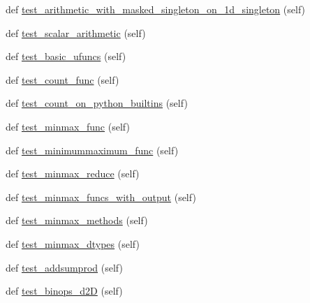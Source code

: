 \begin{DoxyCompactItemize}
\item 
def \hyperlink{classnumpy_1_1ma_1_1tests_1_1test__core_1_1TestMaskedArrayArithmetic_a35cb9471e5ad18795c32c9a44035321c}{test\+\_\+arithmetic\+\_\+with\+\_\+masked\+\_\+singleton\+\_\+on\+\_\+1d\+\_\+singleton} (self)
\item 
def \hyperlink{classnumpy_1_1ma_1_1tests_1_1test__core_1_1TestMaskedArrayArithmetic_a9ee91ba07bc291ebd9e2cf14cf554380}{test\+\_\+scalar\+\_\+arithmetic} (self)
\item 
def \hyperlink{classnumpy_1_1ma_1_1tests_1_1test__core_1_1TestMaskedArrayArithmetic_abb905e86090430a45d00d5daf079360f}{test\+\_\+basic\+\_\+ufuncs} (self)
\item 
def \hyperlink{classnumpy_1_1ma_1_1tests_1_1test__core_1_1TestMaskedArrayArithmetic_a645ef86882fd85c723d0060db528686d}{test\+\_\+count\+\_\+func} (self)
\item 
def \hyperlink{classnumpy_1_1ma_1_1tests_1_1test__core_1_1TestMaskedArrayArithmetic_a88b8a5dadd22dfe6c2303706ee8e9209}{test\+\_\+count\+\_\+on\+\_\+python\+\_\+builtins} (self)
\item 
def \hyperlink{classnumpy_1_1ma_1_1tests_1_1test__core_1_1TestMaskedArrayArithmetic_aae02540a9b764d1234557474a74f4e7a}{test\+\_\+minmax\+\_\+func} (self)
\item 
def \hyperlink{classnumpy_1_1ma_1_1tests_1_1test__core_1_1TestMaskedArrayArithmetic_a6a9d3f5800ee082cee21e971f173a541}{test\+\_\+minimummaximum\+\_\+func} (self)
\item 
def \hyperlink{classnumpy_1_1ma_1_1tests_1_1test__core_1_1TestMaskedArrayArithmetic_aa391ec0d438872a89decfc0fa714666d}{test\+\_\+minmax\+\_\+reduce} (self)
\item 
def \hyperlink{classnumpy_1_1ma_1_1tests_1_1test__core_1_1TestMaskedArrayArithmetic_a63699edd5e3f24c1bdf454117f7cc7d8}{test\+\_\+minmax\+\_\+funcs\+\_\+with\+\_\+output} (self)
\item 
def \hyperlink{classnumpy_1_1ma_1_1tests_1_1test__core_1_1TestMaskedArrayArithmetic_afdb49db7eefa36050b5df1c707196af9}{test\+\_\+minmax\+\_\+methods} (self)
\item 
def \hyperlink{classnumpy_1_1ma_1_1tests_1_1test__core_1_1TestMaskedArrayArithmetic_a4bdc134600ad5ee22e48250e2bf8a1b9}{test\+\_\+minmax\+\_\+dtypes} (self)
\item 
def \hyperlink{classnumpy_1_1ma_1_1tests_1_1test__core_1_1TestMaskedArrayArithmetic_ad88f4379dbb95b63757165ef99ef6d18}{test\+\_\+addsumprod} (self)
\item 
def \hyperlink{classnumpy_1_1ma_1_1tests_1_1test__core_1_1TestMaskedArrayArithmetic_a9e49841f41696fcb5e7487e8612f8596}{test\+\_\+binops\+\_\+d2D} (self)

\end{DoxyCompactItemize}
